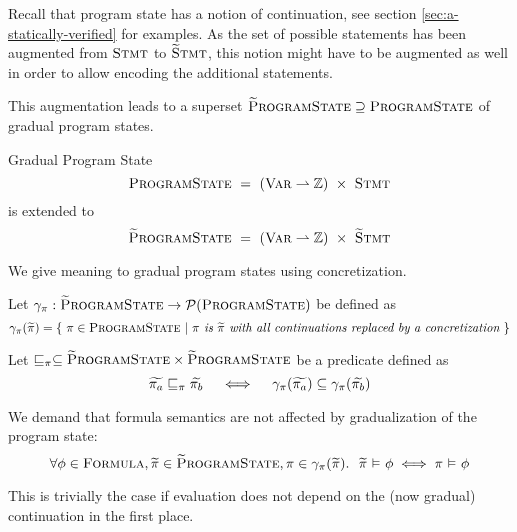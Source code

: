 Recall that program state has a notion of continuation, see section \ref{sec:a-statically-verified} for examples.
As the set of possible statements has been augmented from $\textup{\textsc{Stmt}}$ to $\textup{\textsc{\ensuremath{\widetilde{\text{S}}}tmt}}$, this notion might have to be augmented as well in order to allow encoding the additional statements.

This augmentation leads to a superset $\textup{\textsc{\ensuremath{\widetilde{\text{P}}}rogramState}} \supseteq \textup{\textsc{ProgramState}}$ of gradual program states.
\begin{example}{Gradual Program State}
$$\textup{\textsc{ProgramState}} ~  =~ (\textup{\textsc{Var}} \rightharpoonup \mathbb{Z}) ~\times~ \textup{\textsc{Stmt}}$$
is extended to
$$\textup{\textsc{\ensuremath{\widetilde{\text{P}}}rogramState}} ~ =~ (\textup{\textsc{Var}} \rightharpoonup \mathbb{Z}) ~\times~ \textup{\textsc{\ensuremath{\widetilde{\text{S}}}tmt}}$$
\end{example}

We give meaning to gradual program states using concretization.
\begin{definition}
    Let $\gamma_{\pi} : \textup{\textsc{\ensuremath{\widetilde{\text{P}}}rogramState}} \rightarrow \mathcal{P}(\textup{\textsc{ProgramState}})$ be defined as
    \begin{displaymath}
    \gamma_{\pi}(\widetilde{\pi}) = \{~ \pi \in \textup{\textsc{ProgramState}} ~|~ \textit{$\pi$ is $\widetilde{\pi}$ with all continuations replaced by a concretization} ~\}
    \end{displaymath} 
\end{definition}
\begin{definition}
    Let $\sqsubseteq_{\pi} \subseteq \textup{\textsc{\ensuremath{\widetilde{\text{P}}}rogramState}} \times \textup{\textsc{\ensuremath{\widetilde{\text{P}}}rogramState}}$ be a predicate defined as
    $$\widetilde{\pi_a} \sqsubseteq_{\pi} \widetilde{\pi_b}  \quad\iff\quad  \gamma_{\pi}(\widetilde{\pi_a}) \subseteq \gamma_{\pi}(\widetilde{\pi_b})$$
\end{definition}

\begin{comment}
Consequence:
\begin{displaymath}
\forall \grad{\pi_{\grad{s}}} \in \setGProgramState_{\grad{s}}, \pi \in \gamma_{\pi}(\grad{\pi_{\grad{s}}}).~ \exists s \in \gamma_s(\grad{s}).~ \pi \in \setProgramState_s
\end{displaymath}
\end{comment}

\begin{lemma}
    \label{lemma:gradPS-form-sem}
    We demand that formula semantics are not affected by gradualization of the program state:
    \begin{displaymath}
    \forall \phi \in \textup{\textsc{Formula}}, \widetilde{\pi} \in \textup{\textsc{\ensuremath{\widetilde{\text{P}}}rogramState}}, \pi \in \gamma_{\pi}(\widetilde{\pi}).~~ \widetilde{\pi} \,\,{\vDash}\,\, \phi \iff \pi \,\,{\vDash}\,\, \phi
    \end{displaymath}
    
    This is trivially the case if evaluation does not depend on the (now gradual) continuation in the first place.
\end{lemma}

